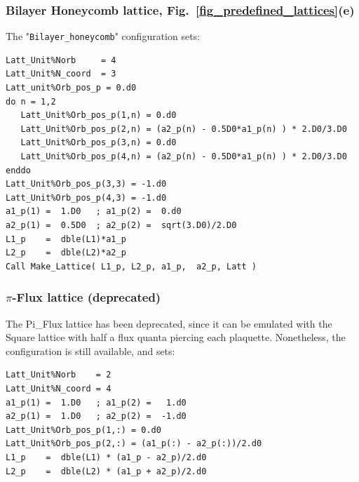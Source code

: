 \subsubsection{Bilayer Honeycomb lattice, Fig.~\ref{fig_predefined_lattices}(e)}
The "\texttt{Bilayer\_honeycomb}"   configuration sets:
\begin{lstlisting}[style=fortran]
Latt_Unit%Norb     = 4
Latt_Unit%N_coord  = 3
Latt_unit%Orb_pos_p = 0.d0
do n = 1,2
   Latt_Unit%Orb_pos_p(1,n) = 0.d0 
   Latt_Unit%Orb_pos_p(2,n) = (a2_p(n) - 0.5D0*a1_p(n) ) * 2.D0/3.D0
   Latt_Unit%Orb_pos_p(3,n) = 0.d0 
   Latt_Unit%Orb_pos_p(4,n) = (a2_p(n) - 0.5D0*a1_p(n) ) * 2.D0/3.D0
enddo
Latt_Unit%Orb_pos_p(3,3) = -1.d0
Latt_Unit%Orb_pos_p(4,3) = -1.d0
a1_p(1) =  1.D0   ; a1_p(2) =  0.d0
a2_p(1) =  0.5D0  ; a2_p(2) =  sqrt(3.D0)/2.D0
L1_p    =  dble(L1)*a1_p
L2_p    =  dble(L2)*a2_p
Call Make_Lattice( L1_p, L2_p, a1_p,  a2_p, Latt )
\end{lstlisting}

\subsubsection{$\pi$-Flux lattice (deprecated)}

The Pi\_Flux lattice has been deprecated, since it can be emulated with the Square lattice with half a flux quanta piercing each plaquette. Nonetheless, the configuration is still available, and sets:
\begin{lstlisting}[style=fortran]
Latt_Unit%Norb    = 2
Latt_Unit%N_coord = 4
a1_p(1) =  1.D0   ; a1_p(2) =   1.d0
a2_p(1) =  1.D0   ; a2_p(2) =  -1.d0
Latt_Unit%Orb_pos_p(1,:) = 0.d0 
Latt_Unit%Orb_pos_p(2,:) = (a1_p(:) - a2_p(:))/2.d0 
L1_p    =  dble(L1) * (a1_p - a2_p)/2.d0
L2_p    =  dble(L2) * (a1_p + a2_p)/2.d0
\end{lstlisting}


